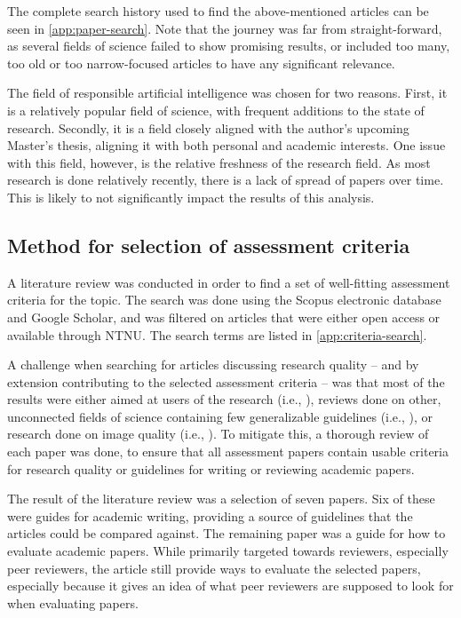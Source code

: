 The complete search history used to find the above-mentioned articles can be seen in \autoref{app:paper-search}. Note that the journey was far from straight-forward, as several fields of science failed to show promising results, or included too many, too old or too narrow-focused articles to have any significant relevance.

The field of responsible artificial intelligence was chosen for two reasons. First, it is a relatively popular field of science, with frequent additions to the state of research. Secondly, it is a field closely aligned with the author's upcoming Master's thesis, aligning it with both personal and academic interests. One issue with this field, however, is the relative freshness of the research field. As most research is done relatively recently, there is a lack of spread of papers over time. This is likely to not significantly impact the results of this analysis.

\subsection{Method for selection of assessment criteria}
\label{sec:criteria-selection}
A literature review was conducted in order to find a set of well-fitting assessment criteria for the topic. The search was done using the Scopus electronic database and Google Scholar, and was filtered on articles that were either open access or available through NTNU. The search terms are listed in \autoref{app:criteria-search}.

A challenge when searching for articles discussing research quality -- and by extension contributing to the selected assessment criteria -- was that most of the results were either aimed at users of the research (i.e., \cite{Mayhew_1993,Domholdt_1985}), reviews done on other, unconnected fields of science containing few generalizable guidelines (i.e., \cite{Wade_2004,Biddle_2011,Polanczyk_2015}), or research done on image quality (i.e., \cite{Wang_2002,Mittal_2012}). To mitigate this, a thorough review of each paper was done, to ensure that all assessment papers contain usable criteria for research quality or guidelines for writing or reviewing academic papers.

The result of the literature review was a selection of seven papers. Six of these \parencite{Rosenfeldt_2000,Jha_2014,Lin_2012,Davidson_2012,Cuschieri_2019,Katz_2006} were guides for academic writing, providing a source of guidelines that the articles could be compared against. The remaining paper \parencite{Martenson_2016} was a guide for how to evaluate academic papers. While primarily targeted towards reviewers, especially peer reviewers, the article still provide ways to evaluate the selected papers, especially because it gives an idea of what peer reviewers are supposed to look for when evaluating papers.

